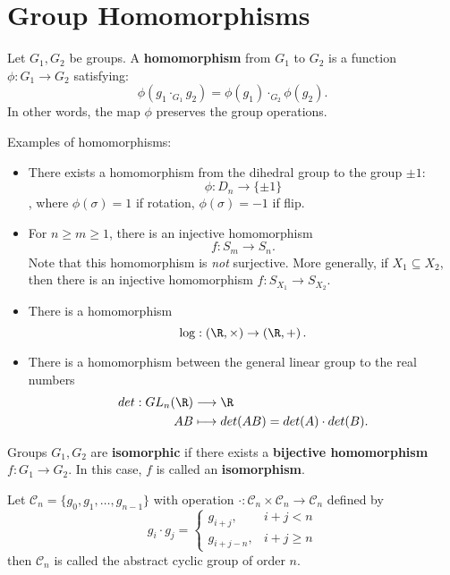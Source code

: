 \documentclass[math1530-lecture-notes]{subfiles}
\begin{document}
\section{Group Homomorphisms}

\begin{definition}[Homomorphisms]{}
  Let $ G_1, G_2$ be groups. A \textbf{homomorphism} from $G_1$ to $G_2$ is a function $\phi:
  G_1\to G_2$ satisfying: \[
    \phi(g_1\cdot_{G_1}g_2)=\phi(g_1)\cdot_{G_2}\phi(g_2)
  .\] In other words, the map $\phi$ preserves the group operations.
\end{definition}

\begin{example}
  Examples of homomorphisms:
  \begin{itemize}
    \item There exists a homomorphism from the dihedral group to the group $\pm 1$:  \[
        \phi: D_n \to \{ \pm 1 \}
      \], where $\phi(\sigma) = 1$ if rotation, $ \phi(\sigma)=-1$ if flip.
    \item For $n\ge m\ge 1$, there is an injective homomorphism \[
        f:S_m \to S_n
      .\] Note that this homomorphism is \textit{not} surjective. More generally, if $X_1\subseteq
      X_2$, then there is an injective homomorphism $f:S_{X_1} \to S_{X_2}$.
    \item There is a homomorphism \[
          \log: \left( \R,\times  \right) \to \left( \R,+ \right) 
      .\] 
    \item There is a homomorphism between the general linear group to the real numbers \begin{align*}
        det: GL_n(\R) &\longrightarrow \R \\
        AB &\longmapsto det(AB) = det(A)\cdot det(B)
    .\end{align*}
  \end{itemize}
\end{example}

\begin{definition}[Isomorphisms]{}
  Groups $  G_1,G_2$ are \textbf{isomorphic} if there exists a \textbf{bijective homomorphism} $f:
  G_1\to G_2$. In this case, $f$ is called an \textbf{isomorphism}.
\end{definition}

\begin{example}
  Let $\mathcal{C}_n=\{ g_0,g_1,\ldots,g_{n-1} \}$ with operation $\cdot :\mathcal{C}_n\times
  \mathcal{C}_n\to\mathcal{C}_n$ defined by \[
    g_i \cdot g_j = \left\{ \begin{array}{rl} g_{i+j}, & i+j<n \\ g_{i+j-n}, & i+j\ge
      n\end{array}\right.
      \] then $\mathcal{C}_n$ is called the abstract cyclic group of order $n$.
\end{example}
\end{document}
